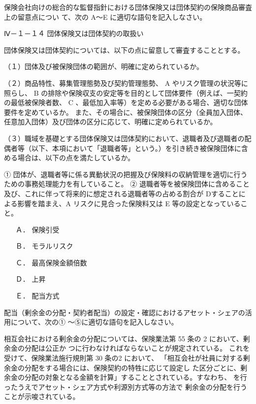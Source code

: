 \documentclass[report,gutter=10mm,fore-edge=10mm,uplatex,dvipdfmx]{jlreq}
\begin{document}
保険会社向けの総合的な監督指針における団体保険又は団体契約の保険商品審査上の留意点につい
て、次の A～E に適切な語句を記入しなさい。

Ⅳ－１－１４ 団体保険又は団体契約の取扱い

団体保険又は団体契約については、以下の点に留意して審査することとする。

（１）団体及び被保険団体の範囲が、明確に定められているか。

（２）商品特性、募集管理態勢及び契約管理態勢、 A やリスク管理の状況等に照らし、 B
の排除や保険収支の安定等を目的として団体要件（例えば、一契約の最低被保険者数、 C
、最低加入率等）を定める必要がある場合、適切な団体要件を定めているか。
また、その場合に、被保険団体の区分（全員加入団体、任意加入団体）及び団体の区分に応じて、明確に定められているか。

（３）職域を基礎とする団体保険又は団体契約において、退職者及び退職者の配偶者等（以下、本項において「退職者等」という。）を引き続き被保険団体に含める場合は、以下の点を満たしているか。

① 団体が、退職者等に係る異動状況の把握及び保険料の収納管理を適切に行うための事務処理能力を有していること。
② 退職者等を被保険団体に含めること及び、これに伴って将来的に想定される退職者等の占める割合が
Dすることによる影響を踏まえ、A リスクに見合った保険料又は E 等の設定となっていること。

\answer{}
\begin{itemize}
\item[ Ａ．] 保険引受 
\item[ Ｂ．] モラルリスク 
\item[ Ｃ．] 最高保険金額倍数 
\item[ Ｄ．] 上昇
\item[ Ｅ．] 配当方式
\end{itemize}

配当（剰余金の分配・契約者配当）の設定・確認におけるアセット・シェアの活用について、次の①
～⑤に適切な語句を記入しなさい。

相互会社における剰余金の分配については、保険業法第 55 条の 2 において、剰余金の分配は公正か
つに行わなければならないことが規定されている。
これを受けて、保険業法施行規則第 30 条の2 において、
「相互会社が社員に対する剰余金の分配をする場合には、保険契約の特牲に応じて設定し
た区分ごとに、剰余金の分配の対象となる金額を計算」することとされている。すなわち、 
を行ったうえでアセット・シェア方式や利源別方式等の方法で
剰余金の分配を行うことが示唆されている。
\end{document}
